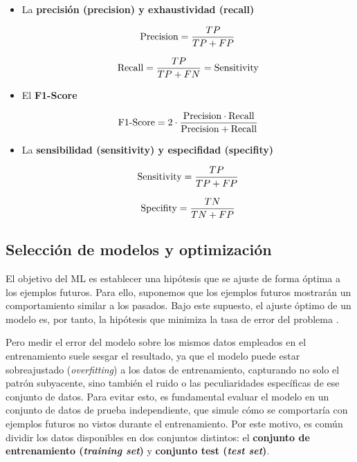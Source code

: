 \begin{itemize}
    \item La \textbf{precisión (precision) y exhaustividad (recall)} 
    
    $$
    \textnormal{Precision} = \frac{TP}{TP+FP}
    $$

    $$
    \textnormal{Recall} = \frac{TP}{TP+FN} = \textnormal{Sensitivity}
    $$
    

    \item El \textbf{F1-Score} 

    $$
    \textnormal{F1-Score} = 2 \cdot \frac{\textnormal{Precision} \cdot \textnormal{Recall}}{\textnormal{Precision} + \textnormal{Recall}}
    $$


    \item La \textbf{sensibilidad (sensitivity) y especifidad (specifity)}

    $$
    \textnormal{Sensitivity} = \frac{TP}{TP+FP}
    $$

    $$
    \textnormal{Specifity} = \frac{TN}{TN+FP}
    $$


\end{itemize}


\subsection{Selección de modelos y optimización}

El objetivo del ML es establecer una hipótesis que se ajuste de forma óptima a los ejemplos futuros. Para 
ello, suponemos que los ejemplos futuros mostrarán un comportamiento similar a los pasados. Bajo este 
supuesto, el ajuste óptimo de un modelo es, por tanto, la hipótesis que minimiza la tasa de error del 
problema \cite{rusell2021}. 

Pero medir el error del modelo sobre los mismos datos empleados en el entrenamiento suele sesgar el resultado, 
ya que el modelo puede estar sobreajustado (\textit{overfitting}) a los datos de entrenamiento, capturando no 
solo el patrón subyacente, sino también el ruido o las peculiaridades específicas de ese conjunto de datos.
Para evitar esto, es fundamental evaluar el modelo en un conjunto de datos de prueba independiente, que simule 
cómo se comportaría con ejemplos futuros no vistos durante el entrenamiento. Por este motivo, es común dividir 
los datos disponibles en dos conjuntos distintos: el \textbf{conjunto de entrenamiento (\textit{training 
set})} y \textbf{conjunto test (\textit{test set})}.

